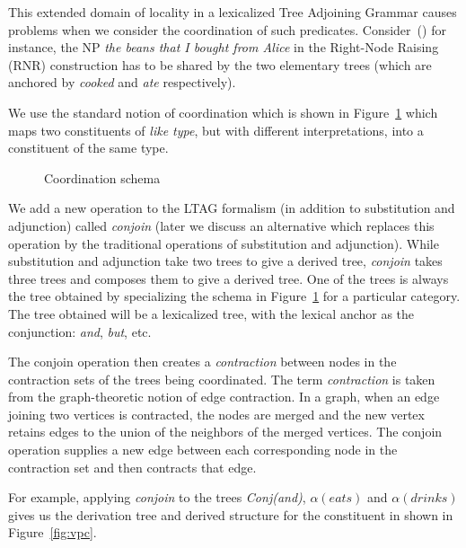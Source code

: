 This extended domain of locality in a lexicalized Tree Adjoining
Grammar causes problems when we consider the coordination of such
predicates. Consider~() for instance, the NP {\em the beans that
  I bought from Alice} in the Right-Node Raising (RNR) construction
has to be shared by the two elementary trees (which are anchored by
{\em cooked} and {\em ate} respectively).


We use the standard notion of coordination which is shown in
Figure~\ref{fig:conj} which maps two constituents of {\em like type},
but with different interpretations, into a constituent of the same
type.

\begin{figure}[htbp]
  \begin{center}
    \leavevmode
  \end{center}
  \caption{Coordination schema}
  \label{fig:conj}
\end{figure}

We add a new operation to the LTAG formalism (in addition to
substitution and adjunction) called {\em conjoin} (later we discuss an
alternative which replaces this operation by the traditional
operations of substitution and adjunction). While substitution and
adjunction take two trees to give a derived tree, {\em conjoin\/}
takes three trees and composes them to give a derived tree.  One of
the trees is always the tree obtained by specializing the schema in
Figure~\ref{fig:conj} for a particular category. The tree obtained
will be a lexicalized tree, with the lexical anchor as the
conjunction: {\em and}, {\em but}, etc.

The conjoin operation then creates a {\em contraction\/} between nodes
in the contraction sets of the trees being coordinated.  The term {\em
  contraction\/} is taken from the graph-theoretic notion of edge
contraction. In a graph, when an edge joining two vertices is
contracted, the nodes are merged and the new vertex retains edges to
the union of the neighbors of the merged vertices. The conjoin
operation supplies a new edge between each corresponding node in the
contraction set and then contracts that edge.

For example, applying {\em conjoin\/} to the trees {\em Conj(and)},
$\alpha(eats)$ and $\alpha(drinks)$ gives us the derivation tree and
derived structure for the constituent in  shown in
Figure~\ref{fig:vpc}.

